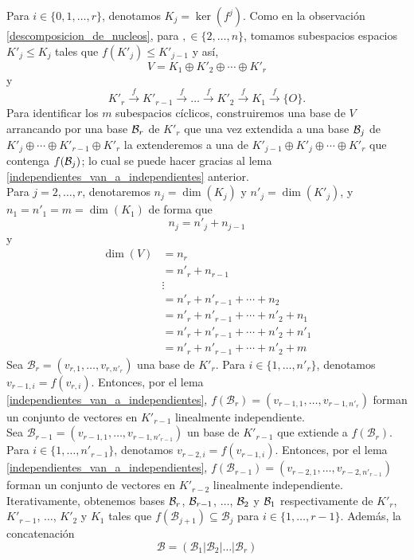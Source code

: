 \dem
Para $i\in\{0,1,\ldots,r\}$, denotamos $K_j=\ker(f^j)$. Como en la observación \ref{descomposicion_de_nucleos}, para $,\in\{2,\ldots,n\}$, tomamos subespacios espacios $K'_j\le K_j$ tales que $f\left(K'_j\right)\le K'_{j-1}$ y así,
$$V =  K_1\oplus K'_2\oplus\cdots\oplus K'_r$$
y
\[
K'_r\overset{f}\longrightarrow K'_{r-1}\overset{f}\longrightarrow\ldots\overset{f}\longrightarrow K'_2\overset{f}\longrightarrow K_1\overset{f}\longrightarrow \{O\}.
\]
Para identificar los $m$ subespacios cíclicos, construiremos una base de $V$ arrancando por una base $\mathcal{B}_r$ de $K'_r$ que una vez extendida a una base $\mathcal{B}_j$ de $K'_{j}\oplus\cdots\oplus K'_{r-1}\oplus K'_{r}$ la extenderemos a una de $K'_{j-1}\oplus K'_{j}\oplus\cdots\oplus K'_{r}$ que contenga $f(\mathcal{B}_j)$; lo cual se puede hacer gracias al lema \ref{independientes_van_a_independientes} anterior.\\
Para $j=2,\ldots,r$, denotaremos $n_j=\dim(K_j)$ y $n'_j=\dim(K'_j)$, y $n_1=n'_1=m=\dim(K_1)$ de forma que
$$n_j=n'_j+n_{j-1}$$
y
\begin{align*}
\dim(V)& =n_r\\
 & =n'_r+n_{r-1}\\
 & \vdots\\
 & =n'_r+n'_{r-1}+\cdots+n_2\\
 & =n'_r+n'_{r-1}+\cdots+n'_2+n_1\\
 & =n'_r+n'_{r-1}+\cdots+n'_2+n'_1\\
 & =n'_r+n'_{r-1}+\cdots+n'_2+m
\end{align*}
Sea $\mathcal{B}_r=(v_{r,1},\ldots,v_{r,n'_r})$ una base de $K'_r$. Para $i\in\{1,\ldots,n'_r\}$, denotamos $v_{r-1,i}=f(v_{r,i})$. Entonces, por el lema \ref{independientes_van_a_independientes}, $f(\mathcal{B}_r)=(v_{r-1,1},\ldots,v_{r-1,n'_r})$ forman un conjunto de vectores en $K'_{r-1}$ linealmente independiente.\\
Sea $\mathcal{B}_{r-1}=(v_{r-1,1},\ldots,v_{r-1,n'_{r-1}})$ un base de $K'_{r-1}$ que extiende a $f(\mathcal{B}_r)$. Para $i\in\{1,\ldots,n'_{r-1}\}$, denotamos $v_{r-2,i}=f(v_{r-1,i})$. Entonces, por el lema \ref{independientes_van_a_independientes}, $f(\mathcal{B}_{r-1})=(v_{r-2,1},\ldots,v_{r-2,n'_{r-1}})$ forman un conjunto de vectores en $K'_{r-2}$ linealmente independiente.\\
Iterativamente, obtenemos bases $\mathcal{B}_r$, $\mathcal{B}_{r-1}$, $\ldots$, $\mathcal{B}_2$ y $\mathcal{B}_1$ respectivamente de $K'_r$, $K'_{r-1}$, $\ldots$, $K'_2$ y $K_1$ tales que $f(\mathcal{B}_{j+1})\subseteq\mathcal{B}_j$ para $i\in\{1,\ldots,r-1\}$. Además, la concatenación
\[
\mathcal{B}=\left(\mathcal{B}_1| \mathcal{B}_2|\ldots| \mathcal{B}_r\right)
\]
